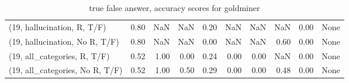 \begin{table*}[h!]
\begin{adjustbox}{width=2\columnwidth,center}
\begin{tabular}{lrrr|rrr|rrr}
(19, hallucination, R, T/F)           &                      0.80 &                   NaN &                       NaN &                          0.20 &                       NaN &                           NaN &                                    NaN &                               0.00 &                                  None \\
(19, hallucination, No R, T/F)        &                      0.80 &                   NaN &                       NaN &                          0.00 &                       NaN &                           NaN &                                   0.60 &                               0.00 &                                  None \\
(19, all\_categories, R, T/F)          &                      0.52 &                  1.00 &                      0.00 &                          0.24 &                      0.00 &                          0.00 &                                    NaN &                               0.00 &                                  None \\
(19, all\_categories, No R, T/F)       &                      0.52 &                  1.00 &                      0.50 &                          0.29 &                      0.00 &                          0.00 &                                   0.48 &                               0.00 &                                  None \\


\bottomrule
\end{tabular}
\end{adjustbox}
\caption{true false answer, accuracy scores for goldminer}
\end{table*}